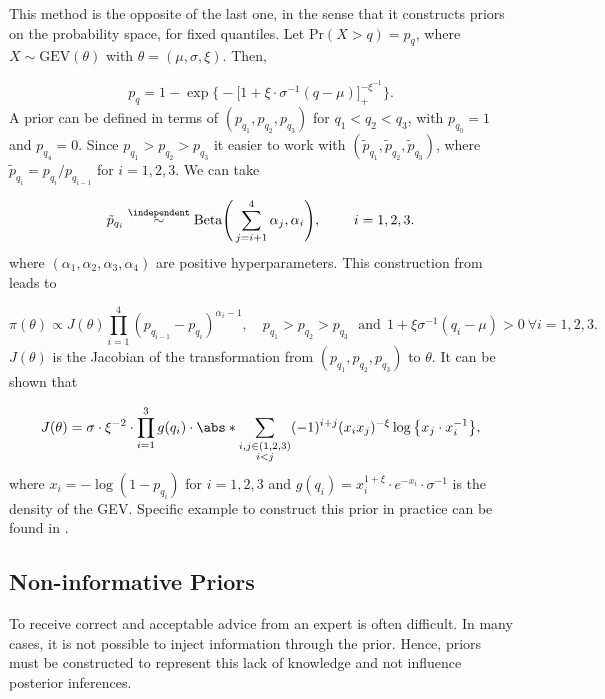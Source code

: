 This method is the opposite of the last one, in the sense that it constructs priors on the probability space, for fixed quantiles.
 Let $\text{Pr}(X>q)=p_q$, where $X\sim \text{GEV}(\theta)$ with $\theta=(\mu,\sigma,\xi)$. Then, 

\begin{equation*}
p_q=1-\exp\bigg\{-\Big[1+\xi\cdot\sigma^{-1}(q-\mu)\Big]_+^{-\xi^{-1}}\bigg\}.
\end{equation*}
A prior can be defined in terms of $(p_{q_1},p_{q_2},p_{q_3})$ for $q_1<q_2<q_3$, with $p_{q_0}=1$ and $p_{q_4}=0$. Since $p_{q_1}>p_{q_2}>p_{q_3}$ it easier to work with $(\tilde{p}_{q_1},\tilde{p}_{q_2},\tilde{p}_{q_3})$, where $\tilde{p}_{q_i}=p_{q_i}/p_{q_{i-1}}$ for $i=1,2,3$. We can take 

\begin{equation}
\tilde{p}_{q_i}\stackrel{\independent}{\sim}\text{Beta}\Bigg(\sum_{j=i+1}^4 \alpha_j,\alpha_i\Bigg), \qquad \ i=1,2,3.
\end{equation}
where $(\alpha_1,\alpha_2,\alpha_3,\alpha_4)$ are positive hyperparameters.
This construction from \citet{Crowder1992} leads to 

\begin{equation*}
\pi(\theta)\propto J(\theta)\prod_{i=1}^4(p_{q_{i-1}}-p_{q_i})^{\alpha_i-1}, \quad  p_{q_1}>p_{q_2}>p_{q_3} \ \ \ \text{and} \ \ 1+\xi\sigma^{-1}(q_i-\mu)>0 \ \forall i=1,2,3.
\end{equation*}
$J(\theta)$ is the Jacobian of the transformation from $(p_{q_1}, p_{q_2},p_{q_3})$ to $\theta$. It can be shown that 

\begin{equation}
J(\theta)=\sigma\cdot\xi^{-2}\cdot\prod_{i=1}^3g(q_i)\cdot \abs*{\sum_{\substack{i,j\in(1,2,3) \\ i<j}} (-1)^{i+j} (x_ix_j)^{-\xi} \log\big\{x_j\cdot x_i^{-1}\big\}},
\end{equation}
where $x_i=-\log(1-p_{q_i})$ for $i=1,2,3$ and $g(q_i)=x_i^{1+\xi}\cdot e^{-x_i}\cdot\sigma^{-1}$
is the density of the GEV.
Specific example to construct this prior in practice can be found in \citet[pp.272]{dey_extreme_2016}.

\subsection{Non-informative Priors}\label{sec:noninfoprior}

To receive correct and acceptable advice from an expert is often difficult.
In many cases, it is not possible to inject information through the prior. 
Hence, priors must be constructed to represent this lack of knowledge and not influence posterior inferences. 

